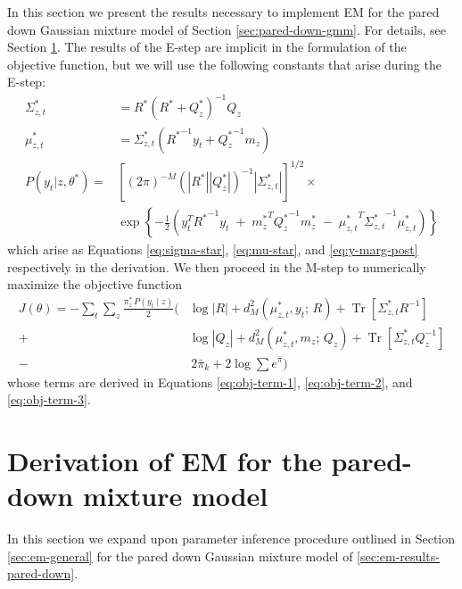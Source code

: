 \documentclass{article}         %
\newcommand{\inv}{^{-1}}
\newcommand{\abs}[1]{\left| #1 \right|}
\newcommand{\cb}[1]{\left\{ #1 \right\}}
\newcommand{\pn}[1]{\left( #1 \right)}
\newcommand{\bc}[1]{\left[ #1 \right]}
\DeclareMathOperator{\Tr}{Tr}
\begin{document}
In this section we present the results necessary to implement EM for the pared down Gaussian mixture model of Section \ref{sec:pared-down-gmm}. For details, see Section \ref{sec:em-pared-down-derive}. The results of the E-step are implicit in the formulation of the objective function, but we will use the following constants that arise during the E-step:
\begin{align}
    \Sigma_{z, t}^* &= R^* \pn{R^* + Q^*_{z}}\inv Q_{z} \\
    \mu_{z, t}^* &= \Sigma_{z, t}^* \pn{ {R^*}\inv y_t + {Q^*_z}\inv m_{z} } \\
    P(y_t | z, \theta^*) =& \bc{\pn{2\pi}^{-M} \pn{\abs{R^*} \abs{Q_z^*}}\inv \abs{ \Sigma^*_{z, t}}}^{1/2} \times \\
     & \exp\cb{-\frac{1}{2}\pn{y_t^T{R^*}\inv y_t \;+\; {m_z^*}^T{Q_z^*}\inv {m_z^*} \;-\; {\mu_{z, t}^*}^T {\Sigma_{z, t}^*}\inv {\mu_{z, t}^*}}}
\end{align}
which arise as Equations \ref{eq:sigma-star}, \ref{eq:mu-star}, and \ref{eq:y-marg-post} respectively in the derivation. We then proceed in the M-step to numerically maximize the objective function
\begin{align}
    J(\theta) = -\sum_t\sum_z \frac{\pi_z^*\,P(y_t\mid z)}{2} \bigg( 
      & \log\abs{R} + d^2_M(\mu_{z,t}^* , y_t ;\, R) + \Tr\bc{\Sigma_{z, t}^* R\inv} \\
    + & \log\abs{Q_z} + d^2_M(\mu_{z,t}^* , m_z ;\, Q_z) + \Tr\bc{\Sigma_{z, t}^* Q_z\inv} \\
    - &\, 2\bar\pi_k + 2\log\sum e^{\bar\pi} \bigg) \label{eqn:objective}
\end{align}
whose terms are derived in Equations \ref{eq:obj-term-1}, \ref{eq:obj-term-2}, and \ref{eq:obj-term-3}.






\section{Derivation of EM for the pared-down mixture model}
\label{sec:em-pared-down-derive}

In this section we expand upon parameter inference procedure outlined in Section \ref{sec:em-general} for the pared down Gaussian mixture model of \ref{sec:em-results-pared-down}.
\end{document}
